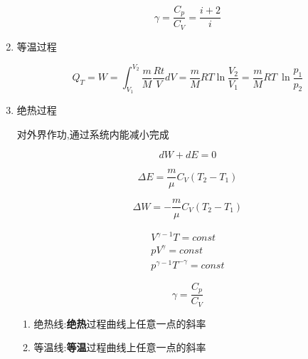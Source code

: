 \begin{enumerate}
          \begin{equation}
              \gamma{}=\frac{C_p}{C_V}=\frac{i+2}{i}
          \end{equation}

    \item 等温过程

          \begin{equation}
              Q_T=W=\int_{V_1}^{V_2}{\frac{m}{M}\frac{Rt}{V}dV}=\frac{m}{M}RT\ln\frac{V_2}{V_1}=\frac{m}{M}RT~\ln{\frac{p_1}{p_2}}
          \end{equation}

    \item 绝热过程

          对外界作功,通过系统内能减小完成

          \begin{equation}
              dW+dE=0
          \end{equation}

          \begin{equation}
              \Delta{E}=\frac{m}{\mu}C_V(T_2-T_1)
          \end{equation}

          \begin{equation}
              \Delta{W}=-\frac{m}{\mu}C_V(T_2-T_1)
          \end{equation}

          \begin{equation}
              \begin{aligned}
                  V^{\gamma{}-1}T=\mathit{const} \\
                  pV^{\gamma}=\mathit{const}     \\
                  p^{\gamma{}-1}T^{-\gamma}=\mathit{const}
              \end{aligned}
          \end{equation}

          \begin{equation}
              \gamma{}=\frac{C_p}{C_V}
          \end{equation}

          \begin{enumerate}
              \item 绝热线:\textbf{绝热}过程曲线上任意一点的斜率
              \item 等温线:\textbf{等温}过程曲线上任意一点的斜率
          \end{enumerate}

\end{enumerate}